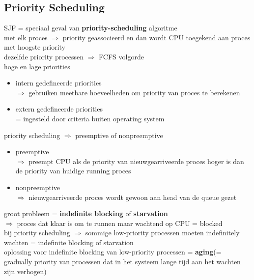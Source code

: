 \documentclass{report}
\begin{document}
\subsection{Priority Scheduling}
SJF = speciaal geval van \textbf{priority-scheduling} algoritme
\\met elk proces $\Rightarrow$ priority geassocieerd en dan wordt CPU toegekend aan proces met hoogste priority
\\dezelfde priority processen $\Rightarrow$ FCFS volgorde 
\\hoge en lage priorities
\begin{itemize}
\item intern gedefineerde priorities
\\$\Rightarrow$ gebruiken meetbare hoeveelheden om priority van proces te berekenen
\item extern gedefineerde priorities
\\ = ingesteld door criteria buiten operating system
\end{itemize}
priority scheduling $\Rightarrow$ preemptive of nonpreemptive
\begin{itemize}
\item preemptive
\\ $\Rightarrow$ preempt CPU als de priority van nieuwgearriveerde proces hoger is dan de priority van huidige running proces
\item nonpreemptive
\\ $\Rightarrow$ nieuwgearriveerde proces wordt gewoon aan head van de queue gezet
\end{itemize}
groot probleem = \textbf{indefinite blocking} of \textbf{starvation} 
\\$\Rightarrow$ proces dat klaar is om te runnen maar wachtend op CPU = blocked
\\bij priority scheduling $\Rightarrow$ sommige low-priority processen moeten indefinitely wachten = indefinite blocking of starvation
\\oplossing voor indefinite blocking van low-priority processen = \textbf{aging}(= gradually priority van processen dat in het systeem lange tijd aan het wachten zijn verhogen)
\end{document}
